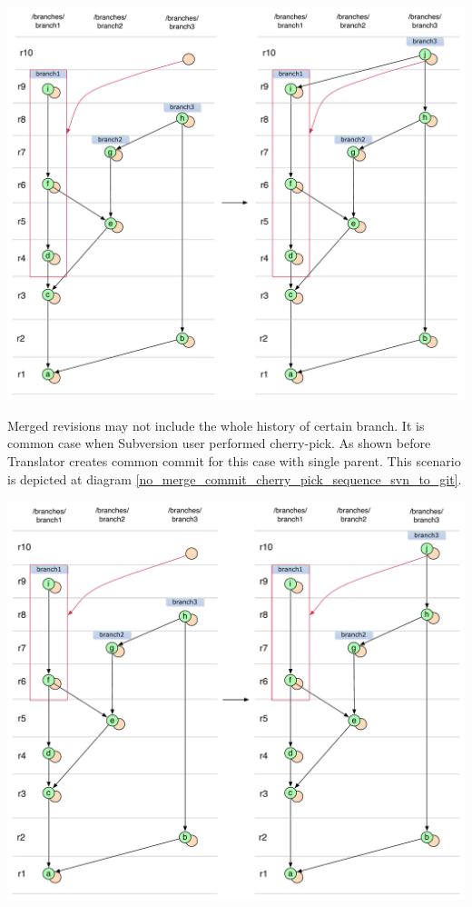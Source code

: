 \begin{center}
\includegraphics[width=\textwidth]{img/diagrams/merge_sequence_svn_to_git.pdf}%
\label{merge_sequence_svn_to_git}%
\end{center}

Merged revisions may not include the whole history of certain branch. It is common case when Subversion user performed cherry-pick. As shown before Translator creates common commit for this case with single parent. This scenario is depicted at diagram \ref{no_merge_commit_cherry_pick_sequence_svn_to_git}.

\begin{center}
\includegraphics[width=\textwidth]{img/diagrams/no_merge_commit_cherry_pick_sequence_svn_to_git.pdf}%
\label{no_merge_commit_cherry_pick_sequence_svn_to_git}%
\end{center}

